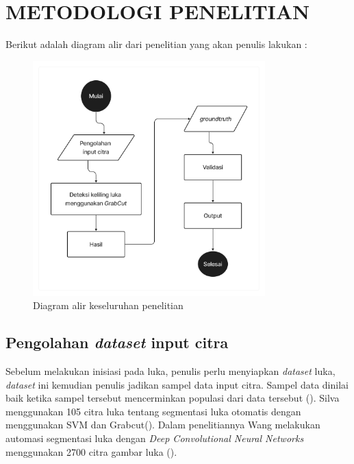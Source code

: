 
\chapter{METODOLOGI PENELITIAN}

Berikut adalah diagram alir dari penelitian yang akan penulis lakukan :

\begin{figure}[H]
	\centering{}
	\includegraphics[width=0.8\textwidth]{gambar/gambar-3_1.png}
	\caption{Diagram alir keseluruhan penelitian}
  \end{figure}

\section{Pengolahan \emph{dataset} input citra}

Sebelum melakukan inisiasi pada luka, penulis perlu menyiapkan \emph{dataset} luka, \emph{dataset}
ini kemudian penulis jadikan sampel data input citra. Sampel data dinilai baik 
ketika sampel tersebut mencerminkan populasi dari data tersebut (\cite{Rizki:2022}). 
Silva menggunakan 105 citra luka tentang segmentasi luka otomatis dengan menggunakan 
SVM dan Grabcut(\cite{Silva:2015}). Dalam penelitiannya Wang melakukan automasi segmentasi luka dengan
\emph{Deep Convolutional Neural Networks} menggunakan 2700 citra gambar luka (\cite{Wang:2015}).

